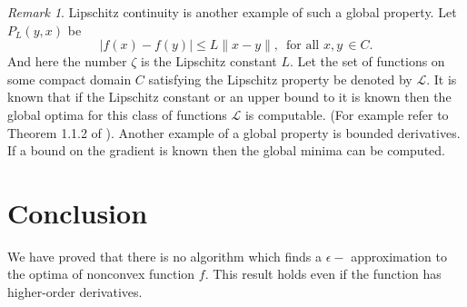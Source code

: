 \documentclass[a4paper,11pt]{article}
\theoremstyle{definition}
\theoremstyle{remark}
\newtheorem{remark}[theorem]{Remark}
\begin{document}
	\begin{remark}
		Lipschitz continuity is another example of such a global property. Let $P_L(y,x)$ be 
		\[|f(x)-f(y)| \leq L \parallel x - y \parallel, \, \mbox{ for all } x,y \, \in C.\]
		And here the number $\zeta$ is the Lipschitz constant $L$. Let the set of functions on some compact domain $C$ satisfying the Lipschitz property be denoted by $\mathcal{L}$. It is known that if the Lipschitz constant or an upper bound to it is known then the global optima for this class of functions $\mathcal{L}$ is computable. (For example refer to Theorem 1.1.2 of \cite{nest}). Another example of a global property is bounded derivatives. If a bound on the gradient is known then the global minima can be computed.
	\end{remark}
	
	\section{Conclusion}
	We have proved that there is no algorithm which finds a $\epsilon-$ approximation to the optima of nonconvex function $f$. This result holds even if the function has higher-order derivatives.
	
	
	
	
	
	
	
	
	
	
\end{document}
